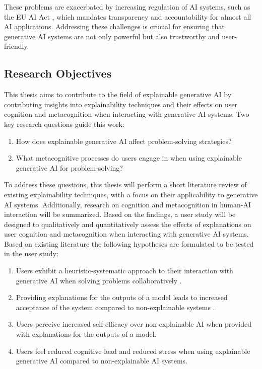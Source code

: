 These problems are exacerbated by increasing regulation of \ac{AI} systems, such as the \ac{EU} \ac{AI} Act \parencite{EuropeanUnion2024}, which mandates transparency and accountability for almost all \ac{AI} applications. Addressing these challenges is crucial for ensuring that generative \ac{AI} systems are not only powerful but also trustworthy and user-friendly.

\subsection{Research Objectives} \label{subsec:research-objectives}

This thesis aims to contribute to the field of explainable generative \ac{AI} by contributing insights into explainability techniques and their effects on user cognition and metacognition when interacting with generative \ac{AI} systems. Two key research questions guide this work:

\begin{enumerate}[label=(\textbf{RQ\arabic*}),leftmargin=4em]
    \item How does explainable generative \ac{AI} affect problem-solving strategies?
    \item What metacognitive processes do users engage in when using explainable generative \ac{AI} for problem-solving?
\end{enumerate}

To address these questions, this thesis will perform a short literature review of existing explainability techniques, with a focus on their applicability to generative \ac{AI} systems. Additionally, research on cognition and metacognition in human-\ac{AI} interaction will be summarized. Based on the findings, a user study will be designed to qualitatively and quantitatively assess the effects of explanations on user cognition and metacognition when interacting with generative \ac{AI} systems. Based on existing literature the following hypotheses are formulated to be tested in the user study:

\begin{enumerate}[label=(\textbf{H{\arabic*}}),leftmargin=4em]
    \item Users exhibit a heuristic-systematic approach to their interaction with generative \ac{AI} when solving problems collaboratively \parencite{Jussupow2021}.
    \item Providing explanations for the outputs of a model leads to increased acceptance of the system compared to non-explainable systems \parencite{Li2022}.
    \item Users perceive increased self-efficacy over non-explainable \ac{AI} when provided with explanations for the outputs of a model.
    \item Users feel reduced cognitive load and reduced stress when using explainable generative \ac{AI} compared to non-explainable \ac{AI} systems.
\end{enumerate}


